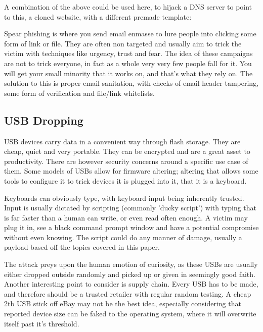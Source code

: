 A combination of the above could be used here, to hijack a DNS server to point to this, a cloned website, with a different premade template:

Spear phishing is where you send email enmasse to lure people into clicking some form of link or file. They are often non targeted and usually aim to trick the victim with techniques like urgency, trust and fear. The idea of these campaigns are not to trick everyone, 
in fact as a whole very very few people fall for it. You will get your small minority that it works on, and that's what they rely on. The solution to this is proper email sanitation, with checks of email header tampering, some form of verification and file/link whitelists.

\subsection{USB Dropping}
USB devices carry data in a convenient way through flash storage. They are cheap, quiet and very portable. They can be encrypted and are a great asset to productivity. 
There are however security concerns around a specific use case of them. Some models of USBs allow for firmware altering; altering that allows some tools to configure it to trick
devices it is plugged into it, that it is a keyboard. 

Keyboards can obviously type, with keyboard input being inherently trusted. Input is usually dictated by scripting (commonly 'ducky script')
with typing that is far faster than a human can write, or even read often enough. A victim may plug it in, see a black command prompt window and have a potential compromise without even knowing. 
The script could do any manner of damage, usually a payload based off the topics covered in this paper. 

The attack preys upon the human emotion of curiosity, as these USBs are usually either dropped outside randomly and picked up or given in seemingly good faith. Another interesting point to consider is supply chain.
Every USB has to be made, and therefore should be a trusted retailer with regular random testing. A cheap 2tb USB stick off eBay may not be the best idea, especially considering that reported device size can be faked to the operating system,
where it will overwrite itself past it's threshold.

